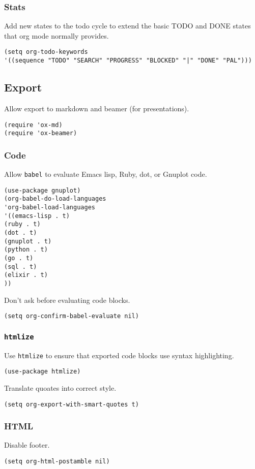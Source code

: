 \documentclass[11pt]{article}
\begin{document}
\subsubsection*{Stats}
\label{sec:orgae98f50}
Add new states to the todo cycle to extend the basic TODO and DONE states that
org mode normally provides.
\begin{verbatim}
(setq org-todo-keywords
'((sequence "TODO" "SEARCH" "PROGRESS" "BLOCKED" "|" "DONE" "PAL")))
\end{verbatim}
\subsection*{Export}
\label{sec:orgafcd10a}
Allow export to markdown and beamer (for presentations).
\begin{verbatim}
(require 'ox-md)
(require 'ox-beamer)
\end{verbatim}
\subsubsection*{Code}
\label{sec:orga4eff57}
Allow \texttt{babel} to evaluate Emacs lisp, Ruby, dot, or Gnuplot code.
\begin{verbatim}
(use-package gnuplot)
(org-babel-do-load-languages
'org-babel-load-languages
'((emacs-lisp . t)
(ruby . t)
(dot . t)
(gnuplot . t)
(python . t)
(go . t)
(sql . t)
(elixir . t)
))
\end{verbatim}
Don't ask before evaluating code blocks.
\begin{verbatim}
(setq org-confirm-babel-evaluate nil)
\end{verbatim}
\subsubsection*{\texttt{htmlize}}
\label{sec:org78409ce}
Use \texttt{htmlize} to ensure that exported code blocks use syntax highlighting.
\begin{verbatim}
(use-package htmlize)
\end{verbatim}
Translate quoates into correct style.
\begin{verbatim}
(setq org-export-with-smart-quotes t)
\end{verbatim}
\subsubsection*{HTML}
\label{sec:org496fce7}
Disable footer.
\begin{verbatim}
(setq org-html-postamble nil)
\end{verbatim}
\end{document}
